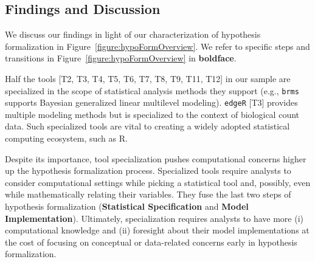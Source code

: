 \subsection{Findings and Discussion}
\tableSoftwareAnalysis
We discuss our findings in light of our characterization of hypothesis
formalization in Figure~\ref{figure:hypoFormOverview}. We refer to specific steps and
transitions in Figure~\ref{figure:hypoFormOverview} in \textbf{boldface}.


Half the tools [T2, T3, T4, T5, T6, T7, T8, T9, T11, T12] in our sample are
specialized in the scope of statistical analysis methods they support (e.g.,
\texttt{brms} supports Bayesian generalized linear multilevel modeling).
\texttt{edgeR} [T3] provides multiple modeling methods but is specialized to the
context of biological count data. Such specialized tools are vital to creating a
widely adopted statistical computing ecosystem, such as R. 

Despite its importance, tool specialization pushes computational concerns higher
up the hypothesis formalization process. Specialized tools require
analysts to consider computational settings while picking a statistical tool
and, possibly, even while mathematically relating their variables. They fuse the
last two steps of hypothesis formalization (\textbf{Statistical Specification}
and \textbf{Model Implementation}). Ultimately, specialization requires analysts
to have more (i) computational knowledge and (ii) foresight about their model
implementations at the cost of focusing on conceptual or data-related concerns
early in hypothesis formalization. 


